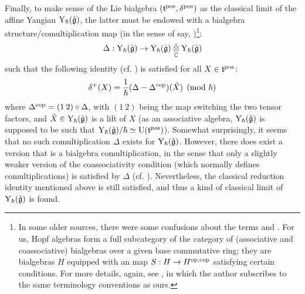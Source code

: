         Finally, to make sense of the Lie bialgebra $(\mathfrak{t}^{\mathrm{pos}}, \delta^{\mathrm{pos}})$ as the classical limit of the affine Yangian $\mathrm{Y}_{\hbar}(\hat{\mathfrak{g}})$, the latter must be endowed with a bialgebra structure/comultiplication map (in the sense of say, \cite[Chapter III]{kassel_quantum_groups})\footnote{In some older sources, there were some confusions about the terms  and . For us, Hopf algebras form a full subcategory of the category of (associative and coassociative) bialgebras over a given base commutative ring; they are bialgebras $H$ equipped with an  map $S: H \to H^{\mathrm{op}, \mathrm{cop}}$ satisfying certain conditions. For more details, again, see \cite[Chapter III]{kassel_quantum_groups}, in which the author subscribes to the same terminology conventions as ours.}:
            $$\Delta: \rmY_{\hbar}(\hat{\g}) \to \rmY_{\hbar}(\hat{\g}) \hattensor_{\bbC} \rmY_{\hbar}(\hat{\g})$$
        such that the following  identity (cf. \cite{etingof_kazhdan_quantisation_1}) is satisfied for all $X \in \mathfrak{t}^{\mathrm{pos}}$:
            $$\delta^+(X) = \frac{1}{\hbar}( \Delta - \Delta^{\mathrm{cop}} )(\tilde{X}) \pmod{\hbar}$$
        where $\Delta^{\mathrm{cop}} = (1 \: 2) \circ \Delta$, with $(1 \: 2)$ being the map switching the two tensor factors, and $\tilde{X} \in \mathrm{Y}_{\hbar}(\hat{\mathfrak{g}})$ is a lift of $X$ (as an associative algebra, $\mathrm{Y}_{\hbar}(\hat{\mathfrak{g}})$ is supposed to be such that $\mathrm{Y}_{\hbar}(\hat{\mathfrak{g}})/\hbar \simeq \mathrm{U}(\mathfrak{t}^{\mathrm{pos}})$). Somewhat surprisingly, it seems that no such comultiplication $\Delta$ exists for $\mathrm{Y}_{\hbar}(\hat{\mathfrak{g}})$. However, there does exist a version that is  a bialgebra comultiplication, in the sense that only a slightly weaker version of the coassociativity condition (which normally defines comultiplications) is satisfied by $\Delta$ (cf. \cite[Sections 4-6]{guay_nakajima_wendlandt_affine_yangian_coproduct}). Nevertheless, the classical reduction identity mentioned above is still satisfied, and thus a kind of classical limit of $\mathrm{Y}_{\hbar}(\hat{\mathfrak{g}})$ is found.

